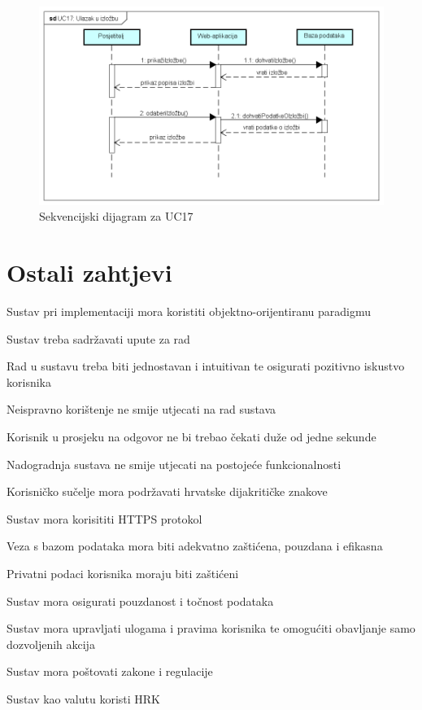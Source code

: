 		\begin{figure}[H]
			
			\includegraphics[width=\textwidth,height=\textheight,keepaspectratio]{sd_uc17}
			\caption{Sekvencijski dijagram za UC17}
			
		\end{figure}
		\eject
	
		\section{Ostali zahtjevi}
		
			\begin{packed_item}
				\item Sustav pri implementaciji mora koristiti objektno-orijentiranu paradigmu
				\item Sustav treba sadržavati upute za rad
				\item Rad u sustavu treba biti jednostavan i intuitivan te osigurati pozitivno iskustvo korisnika
				\item Neispravno korištenje ne smije utjecati na rad sustava
				\item Korisnik u prosjeku na odgovor ne bi trebao čekati duže od jedne sekunde
				\item Nadogradnja sustava ne smije utjecati na postojeće funkcionalnosti 
				\item Korisničko sučelje mora podržavati hrvatske dijakritičke znakove
				\item Sustav mora korisititi HTTPS protokol
				\item Veza s bazom podataka mora biti adekvatno zaštićena, pouzdana i efikasna
				\item Privatni podaci korisnika moraju biti zaštićeni
				\item Sustav mora osigurati pouzdanost i točnost podataka
				\item Sustav mora upravljati ulogama i pravima korisnika
				te omogućiti obavljanje samo dozvoljenih akcija 
				\item Sustav mora poštovati zakone i regulacije
				\item Sustav kao valutu koristi HRK
			\end{packed_item}
		
	